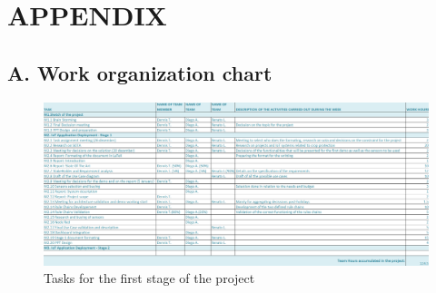\section{APPENDIX}
\subsection*{A. Work organization chart}
\begin{figure}[H]
    \centering
    \includegraphics[width=1\textwidth]{./images/Tasks.png}
    \caption{Tasks for the first stage of the project}
    \label{fig:tasks}
\end{figure}
